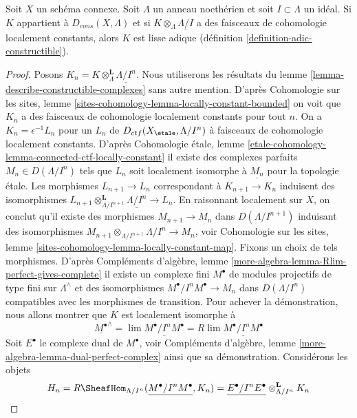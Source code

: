 \begin{lemma}
\label{lemma-connected-adic-lisse}
Soit $X$ un schéma connexe. Soit $\Lambda$ un anneau noethérien et soit
$I \subset \Lambda$ un idéal. Si $K$ appartient à $D_{cons}(X, \Lambda)$
et si $K \otimes_\Lambda \underline{\Lambda/I}$
a des faisceaux de cohomologie localement constants, alors $K$ est lisse adique
(définition \ref{definition-adic-constructible}).
\end{lemma}

\begin{proof}
Posons $K_n = K \otimes_\Lambda^\mathbf{L} \underline{\Lambda/I^n}$.
Nous utiliserons les résultats du lemme \ref{lemma-describe-constructible-complexes}
sans autre mention. D'après Cohomologie sur les sites, lemme
\ref{sites-cohomology-lemma-locally-constant-bounded}
on voit que $K_n$ a des faisceaux de cohomologie localement constants pour tout $n$.
On a $K_n = \epsilon^{-1}L_n$ pour un $L_n$ de
$D_{ctf}(X_\etale, \Lambda/I^n)$ à faisceaux de cohomologie localement constants.
D'après Cohomologie étale, lemme
\ref{etale-cohomology-lemma-connected-ctf-locally-constant}
il existe des complexes parfaits $M_n \in D(\Lambda/I^n)$
tels que $L_n$ soit localement isomorphe à $\underline{M_n}$ pour la topologie \'etale.
Les morphismes $L_{n + 1} \to L_n$ correspondant à $K_{n + 1} \to K_n$
induisent des isomorphismes
$L_{n + 1} \otimes_{\Lambda/I^{n + 1}}^\mathbf{L} \underline{\Lambda/I^n}
\to L_n$. En raisonnant localement sur $X$, on conclut qu'il
existe des morphismes $M_{n + 1} \to M_n$ dans $D(\Lambda/I^{n + 1})$
induisant des isomorphismes
$M_{n + 1} \otimes_{\Lambda/I^{n + 1}} \Lambda/I^n \to M_n$, voir
Cohomologie sur les sites, lemme \ref{sites-cohomology-lemma-locally-constant-map}.
Fixons un choix de tels morphismes. D'après
Compléments d'algèbre, lemme \ref{more-algebra-lemma-Rlim-perfect-gives-complete}
il existe un complexe fini $M^\bullet$ de modules projectifs de type fini sur
$\Lambda^\wedge$ et des isomorphismes $M^\bullet/I^nM^\bullet \to M_n$
dans $D(\Lambda/I^n)$ compatibles avec les morphismes de transition.
Pour achever la démonstration, nous allons montrer que $K$ est localement isomorphe
à
$$
\underline{M^\bullet}^\wedge =
\lim \underline{M^\bullet/I^nM^\bullet} =
R\lim \underline{M^\bullet/I^nM^\bullet}
$$
Soit $E^\bullet$ le complexe dual de $M^\bullet$, voir
Compléments d'algèbre, lemme \ref{more-algebra-lemma-dual-perfect-complex}
ainsi que sa démonstration. Considérons les objets
$$
H_n =
R\SheafHom_{\Lambda/I^n}(\underline{M^\bullet/I^nM^\bullet}, K_n) =
\underline{E^\bullet/I^nE^\bullet} \otimes_{\Lambda/I^n}^\mathbf{L} K_n
$$
\end{proof}
